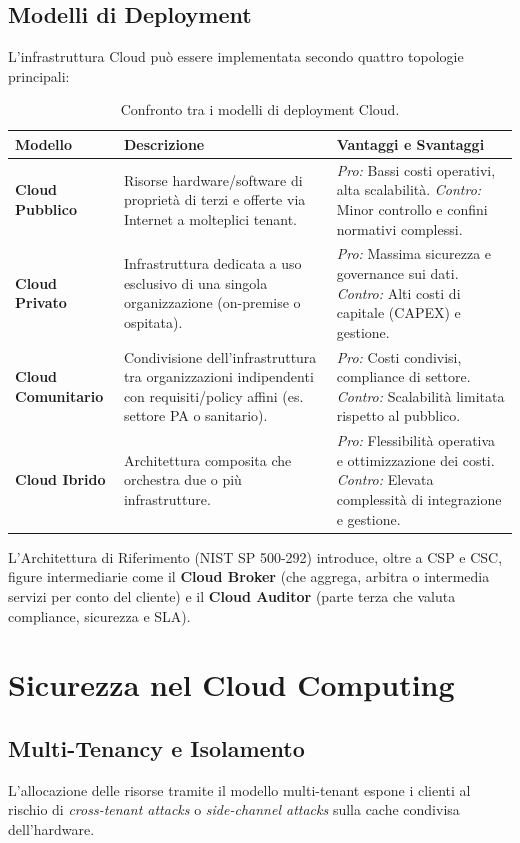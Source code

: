 \subsection{Modelli di Deployment}
L'infrastruttura Cloud può essere implementata secondo quattro topologie principali:

\begin{table}[htbp]
\centering
\begin{tabularx}{\textwidth}{@{}lXX@{}}
\toprule
\textbf{Modello} & \textbf{Descrizione} & \textbf{Vantaggi e Svantaggi} \\ \midrule
\textbf{Cloud Pubblico} & Risorse hardware/software di proprietà di terzi e offerte via Internet a molteplici tenant. & \textit{Pro:} Bassi costi operativi, alta scalabilità. \textit{Contro:} Minor controllo e confini normativi complessi. \\ \addlinespace
\textbf{Cloud Privato} & Infrastruttura dedicata a uso esclusivo di una singola organizzazione (on-premise o ospitata). & \textit{Pro:} Massima sicurezza e governance sui dati. \textit{Contro:} Alti costi di capitale (CAPEX) e gestione. \\ \addlinespace
\textbf{Cloud Comunitario} & Condivisione dell'infrastruttura tra organizzazioni indipendenti con requisiti/policy affini (es. settore PA o sanitario). & \textit{Pro:} Costi condivisi, compliance di settore. \textit{Contro:} Scalabilità limitata rispetto al pubblico. \\ \addlinespace
\textbf{Cloud Ibrido} & Architettura composita che orchestra due o più infrastrutture. & \textit{Pro:} Flessibilità operativa e ottimizzazione dei costi. \textit{Contro:} Elevata complessità di integrazione e gestione. \\ \bottomrule
\end{tabularx}
\caption{Confronto tra i modelli di deployment Cloud.}
\label{tab:cloud_deployment}
\end{table}



L'Architettura di Riferimento (NIST SP 500-292) introduce, oltre a CSP e CSC, figure intermediarie come il \textbf{Cloud Broker} (che aggrega, arbitra o intermedia servizi per conto del cliente) e il \textbf{Cloud Auditor} (parte terza che valuta compliance, sicurezza e SLA).

\section{Sicurezza nel Cloud Computing}
\subsection{Multi-Tenancy e Isolamento}
L'allocazione delle risorse tramite il modello multi-tenant espone i clienti al rischio di \textit{cross-tenant attacks} o \textit{side-channel attacks} sulla cache condivisa dell'hardware.

